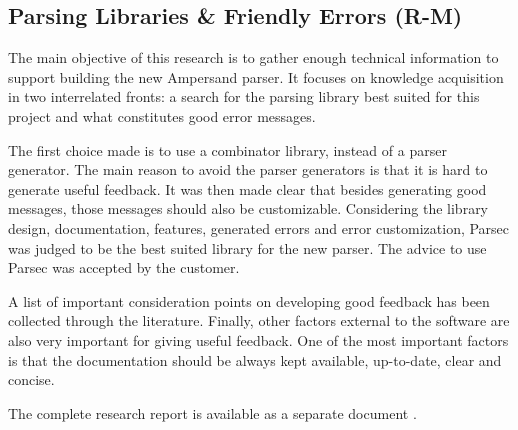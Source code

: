 

\subsection{Parsing Libraries \& Friendly Errors (R-M)}
\label{domain:parsing}
The main objective of this research is to gather enough technical information to support building the new Ampersand parser.
It focuses on knowledge acquisition in two interrelated fronts: a search for the parsing library best suited for this project and what constitutes good error messages.

The first choice made is to use a combinator library, instead of a parser generator.
The main reason to avoid the parser generators is that it is hard to generate useful feedback.
It was then made clear that besides generating good messages, those messages should also be customizable.
Considering the library design, documentation, features, generated errors and error customization, Parsec was judged to be the best suited library for the new parser.
The advice to use Parsec was accepted by the customer.

A list of important consideration points on developing good feedback has been collected through the literature.
Finally, other factors external to the software are also very important for giving useful feedback.
One of the most important factors is that the documentation should be always kept available, up-to-date, clear and concise.

The complete research report is available as a separate document .
